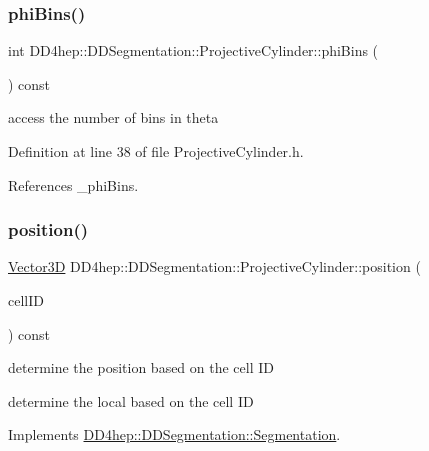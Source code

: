 \subsubsection{\texorpdfstring{phi\+Bins()}{phiBins()}}
{\footnotesize\ttfamily int D\+D4hep\+::\+D\+D\+Segmentation\+::\+Projective\+Cylinder\+::phi\+Bins (\begin{DoxyParamCaption}{ }\end{DoxyParamCaption}) const\hspace{0.3cm}{\ttfamily [inline]}}



access the number of bins in theta 



Definition at line 38 of file Projective\+Cylinder.\+h.



References \+\_\+phi\+Bins.

\hypertarget{class_d_d4hep_1_1_d_d_segmentation_1_1_projective_cylinder_a0795705365655c869e455bab1efcfe3b}{}\label{class_d_d4hep_1_1_d_d_segmentation_1_1_projective_cylinder_a0795705365655c869e455bab1efcfe3b} 
\subsubsection{\texorpdfstring{position()}{position()}}
{\footnotesize\ttfamily \hyperlink{struct_d_d4hep_1_1_d_d_segmentation_1_1_vector3_d}{Vector3D} D\+D4hep\+::\+D\+D\+Segmentation\+::\+Projective\+Cylinder\+::position (\begin{DoxyParamCaption}\item[{const \hyperlink{namespace_d_d4hep_1_1_d_d_segmentation_ac7af071d85cb48820914434a07e21ba1}{Cell\+ID} \&}]{cell\+ID }\end{DoxyParamCaption}) const\hspace{0.3cm}{\ttfamily [virtual]}}



determine the position based on the cell ID 

determine the local based on the cell ID 

Implements \hyperlink{class_d_d4hep_1_1_d_d_segmentation_1_1_segmentation_a594fe6d78667415855858d083b64acad}{D\+D4hep\+::\+D\+D\+Segmentation\+::\+Segmentation}.



